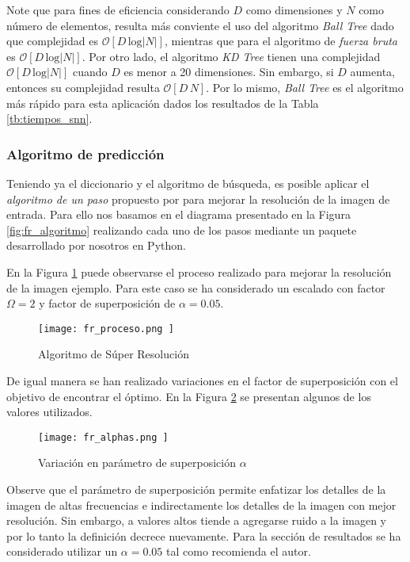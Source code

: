 Note que para fines de eficiencia considerando $D$ como dimensiones 
y $N$ como número de elementos, resulta más conviente el uso del algoritmo
\emph{Ball Tree} dado que complejidad es $\mathcal{O}[D\,\text{log}|N| ]$,
mientras que para el algoritmo de \emph{fuerza bruta} es
$\mathcal{O}[D\,\text{log}|N| ]$. Por otro lado, el algoritmo \emph{KD Tree}
tienen una complejidad $\mathcal{O}[D\,\text{log}|N| ]$ cuando $D$ es menor a 20
dimensiones. Sin embargo, si $D$ aumenta, entonces su complejidad resulta
$\mathcal{O}[D\,N]$. Por lo mismo, \emph{Ball Tree} es el algoritmo más rápido
para esta aplicación dados los resultados de la Tabla \ref{tb:tiempos_snn}. 

\subsubsection{Algoritmo de predicción}
\noindent
Teniendo ya el diccionario y el algoritmo de búsqueda, es posible aplicar el
\emph{algoritmo de un paso} propuesto por \cite{freeman} para mejorar la 
resolución de la imagen de entrada. Para ello nos basamos en el diagrama
presentado en la Figura \ref{fig:fr_algoritmo} realizando cada uno de los 
pasos mediante un paquete desarrollado por nosotros en Python. 

En la Figura \ref{fig:fr_proceso} puede observarse el proceso realizado para mejorar 
la resolución de la imagen ejemplo. Para este caso se ha considerado un escalado
con factor  $\Omega=2$ y factor de superposición de $\alpha=0.05$.

\begin{figure}[H]
    \texttt{[image:  fr\_proceso.png ]}
    \centering
    \caption{ Algoritmo de Súper Resolución}
    \label{fig:fr_proceso}
\end{figure}

De igual manera se han realizado variaciones en el factor de superposición
con el objetivo de encontrar el óptimo. En la Figura \ref{fig:fr_alphas}
se presentan algunos de los valores utilizados. 

\begin{figure}[H]
    \texttt{[image:  fr\_alphas.png ]}
    \centering
    \caption{ Variación en parámetro de superposición $\alpha$ }
    \label{fig:fr_alphas}
\end{figure}

Observe que el parámetro de superposición permite enfatizar los detalles de
la imagen de altas frecuencias e indirectamente los detalles de la
imagen con mejor resolución. Sin embargo, a valores altos tiende a agregarse
ruido a la imagen y por lo tanto la definición decrece nuevamente. Para la 
sección de resultados se ha considerado utilizar un $\alpha=0.05$ tal como 
recomienda el autor. 